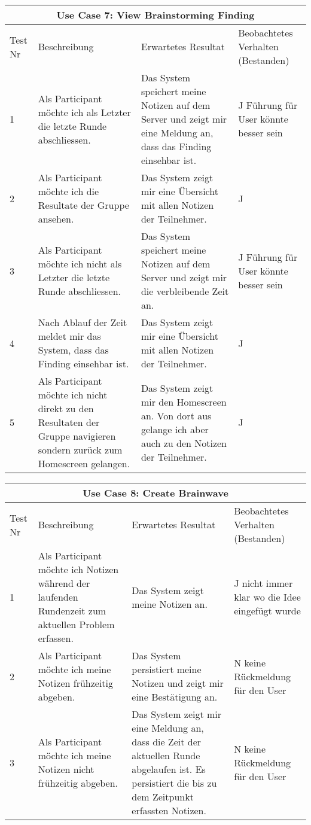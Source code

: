 \renewcommand{\arraystretch}{1.35}
\begin{center}
	\begin{longtable}{| p{1cm} | p{4cm} | p{5cm} | p{3cm} |}
		\hline
		\multicolumn{4}{|c|}{\textbf{Use Case 7: View Brainstorming Finding}}\\
		\hline\hline
		Test Nr & Beschreibung & Erwartetes Resultat & Beo\-bach\-te\-tes Verhalten (Bestanden) \\
		\hline
		1 & Als Participant möchte ich als Letzter die letzte Runde abschliessen. & Das System speichert meine Notizen auf dem Server und zeigt mir eine Meldung an, dass das Finding einsehbar ist. & J Führung für User könnte besser sein \\
		\hline
		2 & Als Participant möchte ich die Resultate der Gruppe ansehen. & Das System zeigt mir eine Übersicht mit allen Notizen der Teilnehmer. & J\\
		\hline
		3 & Als Participant möchte ich nicht als Letzter die letzte Runde abschliessen. & Das System speichert meine Notizen auf dem Server und zeigt mir die verbleibende Zeit an. & J Führung für User könnte besser sein\\
		\hline
		4 & Nach Ablauf der Zeit meldet mir das System, dass das Finding einsehbar ist. & Das System zeigt mir eine Übersicht mit allen Notizen der Teilnehmer. & J\\
		\hline
		5 & Als Participant möchte ich nicht direkt zu den Resultaten der Gruppe navigieren sondern zurück zum Homescreen gelangen. & Das System zeigt mir den Homescreen an. Von dort aus gelange ich aber auch zu den Notizen der Teilnehmer. & J  \\
		\hline
	\end{longtable}
\end{center}


\renewcommand{\arraystretch}{1.35}
\begin{center}
	\begin{longtable}{| p{1cm} | p{4cm} | p{5cm} | p{3cm} |}
		\hline
		\multicolumn{4}{|c|}{\textbf{Use Case 8: Create Brainwave}}\\
		\hline\hline
		Test Nr & Beschreibung & Erwartetes Resultat & Beo\-bach\-te\-tes Verhalten (Bestanden) \\
		\hline
		1 & Als Participant möchte ich Notizen während der laufenden Rundenzeit zum aktuellen Problem erfassen. & Das System zeigt meine Notizen an. & J nicht immer klar wo die Idee eingefügt wurde \\
		\hline
		2 & Als Participant möchte ich meine Notizen frühzeitig abgeben. & Das System persistiert meine Notizen und zeigt mir eine Bestätigung an. & N keine Rückmel\-dung für den User\\
		\hline
		3 & Als Participant möchte ich meine Notizen nicht frühzeitig abgeben. & Das System zeigt mir eine Meldung an, dass die Zeit der aktuellen Runde abgelaufen ist. Es persistiert die bis zu dem Zeitpunkt erfassten Notizen. & N keine Rückmel\-dung für den User \\
		\hline
	\end{longtable}
\end{center}

